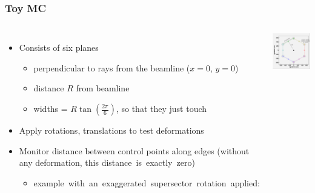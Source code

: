 \documentclass[compress]{beamer}
\begin{document}
\begin{frame}
\frametitle{Toy MC}
\begin{columns}
\begin{itemize}
\item Consists of six planes
\begin{itemize}
\item perpendicular to rays from the beamline ($x=0$, $y=0$)
\item distance $R$ from beamline
\item widths = $R\tan\left(\frac{2\pi}{6}\right)$, so that they just touch
\end{itemize}
\item Apply rotations, translations to test deformations
\item Monitor distance between control points along edges (without any deformation, this \mbox{distance is exactly zero)\hspace{-5 cm}}
\begin{itemize}
\item \mbox{example with an exaggerated supersector rotation applied:\hspace{-5 cm}}
\end{itemize}
\end{itemize}

\includegraphics[width=\linewidth]{model_ideal.pdf}


\end{columns}
\end{frame}
\end{document}
